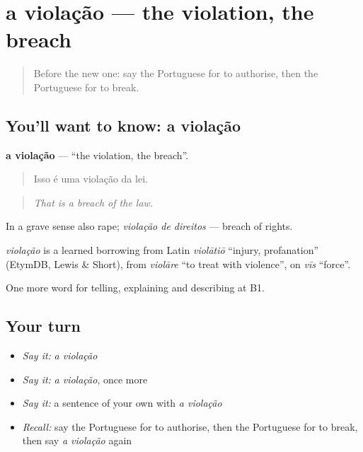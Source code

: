 \section[a violação]{a violação — the violation, the breach}

\label{lesson:PT-C382-violacao}



\begin{quote}
Before the new one: say the Portuguese for to authorise, then the Portuguese for to break.
\end{quote}

\subsection*{You'll want to know: a violação}
\textbf{a violação} — \textquotedblleft{}the violation, the breach\textquotedblright{}.

\begin{quote}
Isso é uma violação da lei.
\end{quote}

\begin{quote}
\emph{That is a breach of the law.}
\end{quote}

In a grave sense also rape; \emph{violação de direitos} — breach of rights.

\begin{cousinweb}
\emph{violação} is a learned borrowing from Latin \emph{violātiō} \textquotedblleft{}injury, profanation\textquotedblright{} (EtymDB, Lewis \& Short), from \emph{violāre} \textquotedblleft{}to treat with violence\textquotedblright{}, on \emph{vīs} \textquotedblleft{}force\textquotedblright{}.
\end{cousinweb}

\begin{grammarlens}[title={What you've built}]
One more word for telling, explaining and describing at B1.
\end{grammarlens}

\subsection*{Your turn}
\begin{itemize}
\raggedright
  \item \emph{Say it:} \emph{a violação}
  \item \emph{Say it:} \emph{a violação}, once more
  \item \emph{Say it:} a sentence of your own with \emph{a violação}
  \item \emph{Recall:} say the Portuguese for to authorise, then the Portuguese for to break, then say \emph{a violação} again
\end{itemize}

